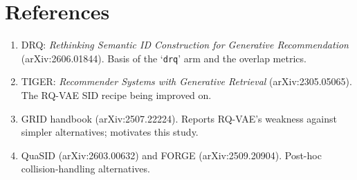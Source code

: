 \documentclass[11pt]{article}
\begin{document}
\section{References}

\begin{enumerate}[nosep,leftmargin=*]
  \item DRQ: \emph{Rethinking Semantic ID Construction for Generative
        Recommendation} (arXiv:2606.01844). Basis of the `\texttt{drq}' arm and
        the overlap metrics.
  \item TIGER: \emph{Recommender Systems with Generative Retrieval}
        (arXiv:2305.05065). The RQ-VAE SID recipe being improved on.
  \item GRID handbook (arXiv:2507.22224). Reports RQ-VAE's weakness against
        simpler alternatives; motivates this study.
  \item QuaSID (arXiv:2603.00632) and FORGE (arXiv:2509.20904). Post-hoc
        collision-handling alternatives.
\end{enumerate}
\end{document}

